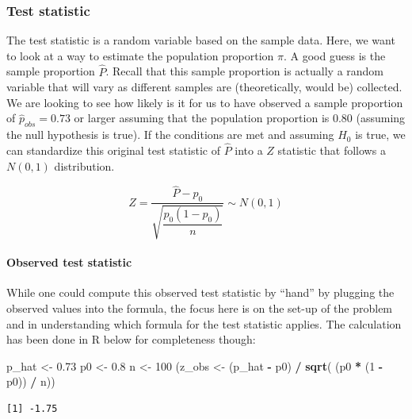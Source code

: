 \documentclass[12pt,]{krantz}
\makeatletter
\newenvironment{Shaded}{\begin{snugshade}}{\end{snugshade}}
\newcommand{\KeywordTok}[1]{\textcolor[rgb]{0.27,0.27,0.27}{\textbf{#1}}}
\newcommand{\DecValTok}[1]{\textcolor[rgb]{0.06,0.06,0.06}{#1}}
\newcommand{\FloatTok}[1]{\textcolor[rgb]{0.06,0.06,0.06}{#1}}
\newcommand{\StringTok}[1]{\textcolor[rgb]{0.5,0.5,0.5}{#1}}
\newcommand{\OperatorTok}[1]{\textcolor[rgb]{0.43,0.43,0.43}{\textbf{#1}}}
\newcommand{\NormalTok}[1]{#1}
\let\oldparagraph\paragraph
\renewcommand{\paragraph}[1]{\oldparagraph{#1}\mbox{}}
\newenvironment{kframe}{%
\medskip{}
\setlength{\fboxsep}{.8em}
 \def\at@end@of@kframe{}%
 \ifinner\ifhmode%
  \def\at@end@of@kframe{\end{minipage}}%
  \begin{minipage}{\columnwidth}%
 \fi\fi%
 \def\FrameCommand##1{\hskip\@totalleftmargin \hskip-\fboxsep
 \colorbox{shadecolor}{##1}\hskip-\fboxsep
     \hskip-\linewidth \hskip-\@totalleftmargin \hskip\columnwidth}%
 \MakeFramed {\advance\hsize-\width
   \@totalleftmargin\z@ \linewidth\hsize
   \@setminipage}}%
 {\par\unskip\endMakeFramed%
 \at@end@of@kframe}
\renewenvironment{Shaded}{\begin{kframe}}{\end{kframe}}
\makeatother
\begin{document}
\subsubsection*{Test statistic}\label{test-statistic-1}


The test statistic is a random variable based on the sample data. Here,
we want to look at a way to estimate the population proportion \(\pi\).
A good guess is the sample proportion \(\hat{P}\). Recall that this
sample proportion is actually a random variable that will vary as
different samples are (theoretically, would be) collected. We are
looking to see how likely is it for us to have observed a sample
proportion of \(\hat{p}_{obs} = 0.73\) or larger assuming that the
population proportion is 0.80 (assuming the null hypothesis is true). If
the conditions are met and assuming \(H_0\) is true, we can standardize
this original test statistic of \(\hat{P}\) into a \(Z\) statistic that
follows a \(N(0, 1)\) distribution.

\[ Z =\dfrac{ \hat{P} - p_0}{\sqrt{\dfrac{p_0(1 - p_0)}{n} }} \sim N(0, 1) \]

\paragraph{Observed test statistic}\label{observed-test-statistic-1}

While one could compute this observed test statistic by ``hand'' by
plugging the observed values into the formula, the focus here is on the
set-up of the problem and in understanding which formula for the test
statistic applies. The calculation has been done in R below for
completeness though:

\begin{Shaded}
\begin{Highlighting}[]
\NormalTok{p_hat <-}\StringTok{ }\FloatTok{0.73}
\NormalTok{p0 <-}\StringTok{ }\FloatTok{0.8}
\NormalTok{n <-}\StringTok{ }\DecValTok{100}
\NormalTok{(z_obs <-}\StringTok{ }\NormalTok{(p_hat }\OperatorTok{-}\StringTok{ }\NormalTok{p0) }\OperatorTok{/}\StringTok{ }\KeywordTok{sqrt}\NormalTok{( (p0 }\OperatorTok{*}\StringTok{ }\NormalTok{(}\DecValTok{1} \OperatorTok{-}\StringTok{ }\NormalTok{p0)) }\OperatorTok{/}\StringTok{ }\NormalTok{n))}
\end{Highlighting}
\end{Shaded}

\begin{verbatim}
[1] -1.75
\end{verbatim}
\end{document}
